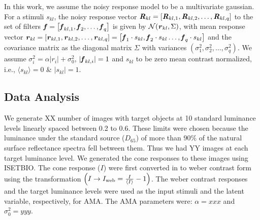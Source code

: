 \documentclass{jov}
\begin{document}
In this work, we assume the noisy response model to be a multivariate gaussian. For a stimuli $s_{kl}$, the noisy response vector ${\textbf{\textit R}}_{kl} = \left[{\textbf{\textit R}}_{kl,1},{\textbf{\textit R}}_{kl,2},\dots,{\textbf{\textit R}}_{kl,q}\right]$ to the set of filters ${\textbf{\textit f}} = \left[{\textbf{\textit f}}_{kl,1},{\textbf{\textit f}}_{2},\dots,{\textbf{\textit f}}_{q}\right]$ is given by $\mathcal{N}({\textbf{\textit r}}_{kl}, \Sigma)$, with mean response vector ${\textbf{\textit r}}_{kl} = \left[{\textbf{\textit r}}_{kl,1},{\textbf{\textit r}}_{kl,2},\dots,{\textbf{\textit r}}_{kl,q}\right] = \left[{\textbf{\textit f}}_{1}\cdot s_{kl},{\textbf{\textit f}}_{2}\cdot s_{kl}\dots,{\textbf{\textit f}}_{q}\cdot s_{kl}\right]$ and the covariance matrix as the diagonal matrix $\Sigma$ with variances $\left(\sigma_1^2, \sigma_2^2,\dots, \sigma_q^2 \right)$. We assume $\sigma_i^2 = \alpha |r_i| + \sigma_0^2$, $|{\textbf{\textit f}}_{kl,i}|=1$ and $s_{kl}$ to be zero mean contrast normalized, i.e., $\langle{s_{kl}}\rangle = 0$ \& ${|s_{kl}|=1}$.

\subsection{Data Analysis} We generate XX number of images with target objects at 10 standard luminance levels linearly spaced between 0.2 to 0.6. These limits were chosen because the luminance under the standard source ($D_{65}$) of more than $90\%$ of the natural surface reflectance spectra fell between them. Thus we had YY images at each target luminance level. We generated the cone responses to these images using ISETBIO. The cone response ($I$) were first converted in to weber contrast form using the transformation $\left(I \rightarrow I_{\rm web} = \frac{I}{\langle I \rangle}-1\right)$. The weber contrast responses and the target luminance levels were used as the input stimuli and the latent variable, respectively, for AMA. The AMA parameters were: $\alpha = xxx$ and $\sigma_0^2 = yyy$.
\end{document}
